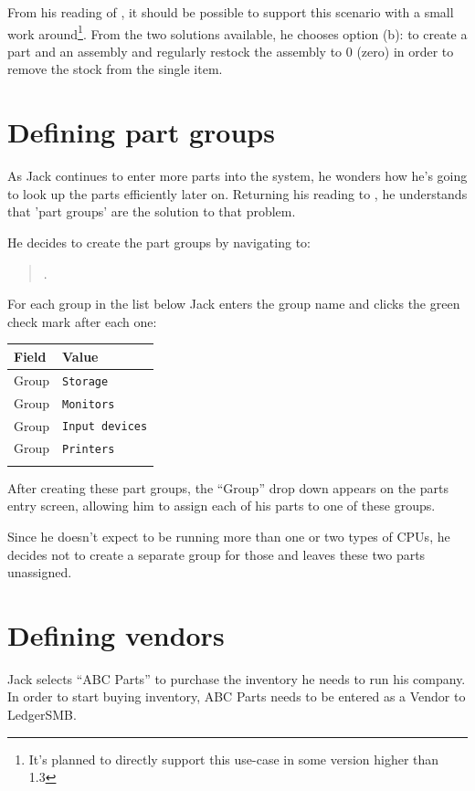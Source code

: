 From his reading of , it should be
possible to support this scenario with a small work around\footnote{It's planned to directly
support this use-case in some version higher than 1.3}. From the two solutions available,
he chooses option (b): to create a part and an assembly and regularly restock the assembly
to 0 (zero) in order to remove the stock from the single item.

\section{Defining part groups}
\label{sec-stock-part-groups}

As Jack continues to enter more parts into the system, he wonders how he's going to
look up the parts efficiently later on. Returning his reading to ,
he understands that 'part groups'  are the solution to that problem. 

He decides to create
the part groups by navigating to:
\begin{quote}
.
\end{quote}
For each group in the list below Jack enters the group name and clicks the green check mark after each one:

\begin{tabular}{ll}
Field & Value \\ \hline
Group & \texttt{Storage}\\
Group & \texttt{Monitors}\\
Group & \texttt{Input devices}\\
Group & \texttt{Printers}\\
\\
\end{tabular}

After creating these part groups, the ``Group'' drop down appears on the parts entry screen,
allowing him to assign each of his parts to one of these groups.

Since he doesn't expect to be running more than one or two types of CPUs, he decides
not to create a separate group for those and leaves these two parts unassigned.

\section{Defining vendors}
\label{sec-stock-defining-vendors}

Jack selects ``ABC Parts'' to purchase the inventory he needs to run his company. In
order to start buying inventory, ABC Parts needs to be entered as a Vendor to LedgerSMB.

